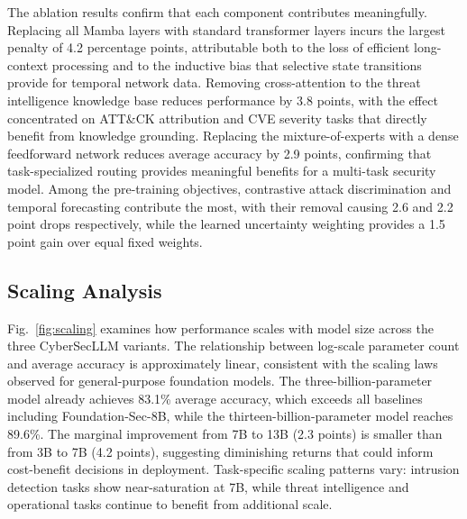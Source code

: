 \documentclass[journal]{IEEEtran}
\newcommand{\modelname}{CyberSecLLM}
\begin{document}
The ablation results confirm that each component contributes meaningfully. Replacing all Mamba layers with standard transformer layers incurs the largest penalty of 4.2 percentage points, attributable both to the loss of efficient long-context processing and to the inductive bias that selective state transitions provide for temporal network data. Removing cross-attention to the threat intelligence knowledge base reduces performance by 3.8 points, with the effect concentrated on ATT\&CK attribution and CVE severity tasks that directly benefit from knowledge grounding. Replacing the mixture-of-experts with a dense feedforward network reduces average accuracy by 2.9 points, confirming that task-specialized routing provides meaningful benefits for a multi-task security model. Among the pre-training objectives, contrastive attack discrimination and temporal forecasting contribute the most, with their removal causing 2.6 and 2.2 point drops respectively, while the learned uncertainty weighting provides a 1.5 point gain over equal fixed weights.

\subsection{Scaling Analysis}
\label{subsec:scaling}

Fig.~\ref{fig:scaling} examines how performance scales with model size across the three \modelname{} variants. The relationship between log-scale parameter count and average accuracy is approximately linear, consistent with the scaling laws observed for general-purpose foundation models. The three-billion-parameter model already achieves 83.1\% average accuracy, which exceeds all baselines including Foundation-Sec-8B, while the thirteen-billion-parameter model reaches 89.6\%. The marginal improvement from 7B to 13B (2.3 points) is smaller than from 3B to 7B (4.2 points), suggesting diminishing returns that could inform cost-benefit decisions in deployment. Task-specific scaling patterns vary: intrusion detection tasks show near-saturation at 7B, while threat intelligence and operational tasks continue to benefit from additional scale.
\end{document}
